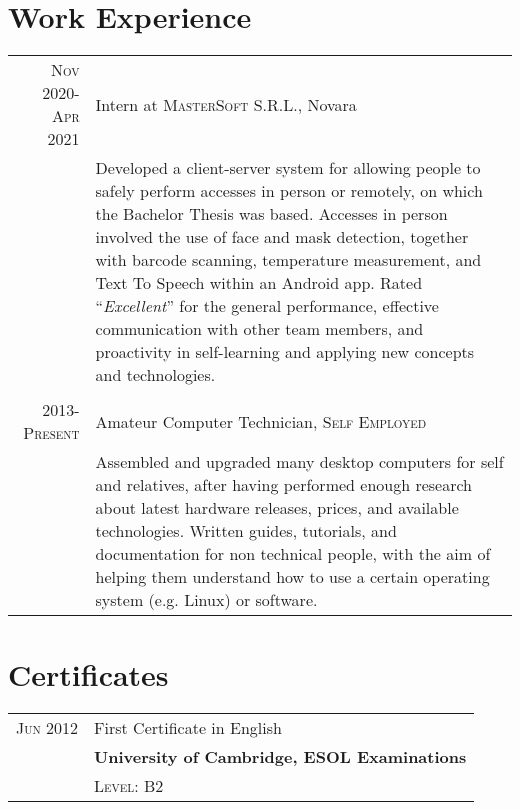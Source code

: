 \documentclass[a4paper,10pt]{article} %
\begin{document}

\section{Work Experience}

\begin{tabular}{r|p{10.5cm}}
\textsc{Nov 2020-Apr 2021} & Intern at \textsc{MasterSoft S.R.L.}, Novara \emph{}\\
& \footnotesize{Developed a client-server system for allowing people to safely perform accesses in person or remotely, on which the Bachelor Thesis was based. Accesses in person involved the use of face and mask detection, together with barcode scanning, temperature measurement, and Text To Speech within an Android app. Rated ``\emph{Excellent}'' for the general performance, effective communication with other team members, and proactivity in self-learning and applying new concepts and technologies.}\\
\multicolumn{2}{c}{}\\


\textsc{2013-Present} & Amateur Computer Technician, \textsc{Self Employed} \emph{}\\
& \footnotesize{Assembled and upgraded many desktop computers for self and relatives, after having performed enough research about latest hardware releases, prices, and available technologies. Written guides, tutorials, and documentation for non technical people, with the aim of helping them understand how to use a certain operating system (e.g. Linux) or software.}
\end{tabular}


\section{Certificates}

\begin{tabular}{rp{10.5cm}}
\textsc{Jun 2012} & First Certificate in English\\
& \textbf{University of Cambridge, ESOL Examinations}\\
& \textsc{Level:} B2
\end{tabular}
\end{document}
